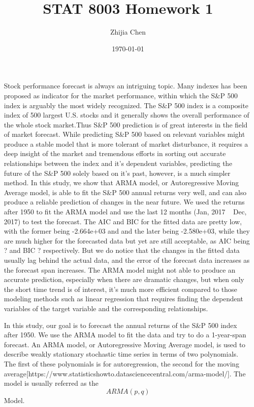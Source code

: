 \documentclass{article}
\title{STAT 8003 Homework 1}
\author{Zhijia Chen}
\date{\today}
\begin{document}
\begin{titlepage}
    \maketitle
\end{titlepage}



Stock performance forecast is always an intriguing topic. Many indexes has been proposed as indicator for the market performance, within which the S\&P 500 index is arguably the most widely recognized. The S\&P 500 index is a composite index of 500 largest U.S. stocks and it generally shows the overall performance of the whole stock market.Thus S\&P 500 prediction is of great interests in the field of market forecast. While predicting S\&P 500 based on relevant variables might produce a stable model that is more tolerant of market disturbance, it requires a deep insight of the market and tremendous efforts in sorting out accurate relationships between the index and it's dependent variables, predicting the future of the S\&P 500 solely based on it's past, however, is a much simpler method. In this study, we show that ARMA model, or Autoregressive Moving Average model, is able to fit the S\&P 500 annual returns very well, and can also produce a reliable prediction of changes in the near future. We used the returns after 1950 to fit the ARMA model and use the last 12 months (Jan, 2017 ~ Dec, 2017) to test the forecast. The AIC and BIC for the fitted data are pretty low, with the former being -2.664e+03 and and the later being -2.580e+03, while they are much higher for the forecasted data but yet are still acceptable, as AIC being ? and BIC ? respectively. But we do notice that the changes in the fitted data usually lag behind the actual data, and the error of the forecast data increases as the forecast span increases. The ARMA model might not able to produce an accurate prediction, especially when there are dramatic changes, but when only the short time trend is of interest, it's much more efficient compared to those modeling methods such as linear regression that requires finding the dependent variables of the target variable and the corresponding relationships.

In this study, our goal is to forecast the annual returns of the S\&P 500 index after 1950. We use the ARMA model to fit the data and try to do a 1-year-span forecast. An ARMA model, or Autoregressive Moving Average model, is used to describe weakly stationary stochastic time series in terms of two polynomials. The first of these polynomials is for autoregression, the second for the moving average[https://www.statisticshowto.datasciencecentral.com/arma-model/]. The model is usually referred as the $$ARMA(p,q)$$ Model.
\end{document}
